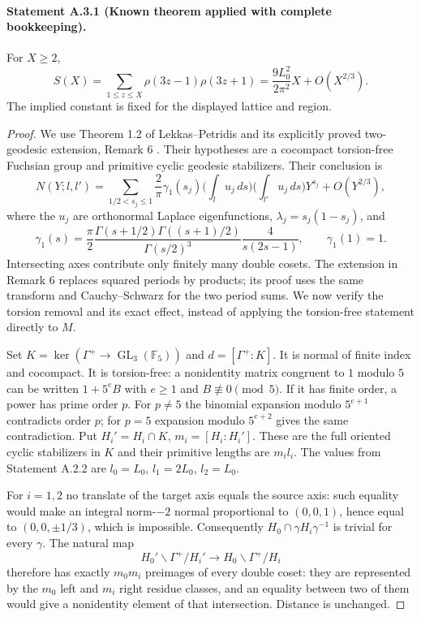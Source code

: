 \paragraph{Statement A.3.1 (Known theorem applied with complete bookkeeping).}
For $X\geq2$,
\begin{equation}\label{A:unrestricted-asymptotic}
 S(X)=\sum_{1\leq z\leq X}\rho(3z-1)\rho(3z+1)
 =\frac{9L_0^2}{2\pi^2}X+O(X^{2/3}).
\end{equation}
The implied constant is fixed for the displayed lattice and region.
\begin{proof}
We use Theorem 1.2 of Lekkas--Petridis and its explicitly proved
two-geodesic extension, Remark 6 \cite{LekkasPetridis2026}.
Their hypotheses are a cocompact torsion-free Fuchsian group and
primitive cyclic geodesic stabilizers. Their conclusion is
\[
 N(Y;l,l')=\sum_{1/2<s_j\leq1}\frac2\pi\gamma_1(s_j)
  \Big(\int_lu_j\,ds\Big)\Big(\int_{l'}u_j\,ds\Big)Y^{s_j}
  +O(Y^{2/3}),
\]
where the $u_j$ are orthonormal Laplace eigenfunctions,
$\lambda_j=s_j(1-s_j)$, and
\[
 \gamma_1(s)=\frac\pi2
 \frac{\Gamma(s+1/2)\Gamma((s+1)/2)}{\Gamma(s/2)^3}
 \frac4{s(2s-1)},\qquad \gamma_1(1)=1.
\]
Intersecting axes contribute only finitely many double cosets.
The extension in Remark 6 replaces squared periods by products;
its proof uses the same transform and Cauchy--Schwarz for the two
period sums. We now verify the torsion removal and its exact effect,
instead of applying the torsion-free statement directly to $M$.

Set $K=\ker(\Gamma^+\to\operatorname{GL}_3(\mathbb F_5))$ and
$d=[\Gamma^+:K]$. It is normal of finite index and cocompact.
It is torsion-free: a nonidentity matrix congruent to $1$ modulo $5$
can be written $1+5^eB$ with $e\geq1$ and $B\not\equiv0\pmod5$.
If it has finite order, a power has prime order $p$. For $p\ne5$
the binomial expansion modulo $5^{e+1}$ contradicts order $p$;
for $p=5$ expansion modulo $5^{e+2}$ gives the same contradiction.
Put $H_i'=H_i\cap K$, $m_i=[H_i:H_i']$. These are the full
oriented cyclic stabilizers in $K$ and their primitive lengths are
$m_i l_i$. The values from Statement A.2.2 are
$l_0=L_0$, $l_1=2L_0$, $l_2=L_0$.

For $i=1,2$ no translate of the target axis equals the source axis:
such equality would make an integral norm-$-2$ normal proportional
to $(0,0,1)$, hence equal to $(0,0,\pm1/3)$, which is impossible.
Consequently $H_0\cap\gamma H_i\gamma^{-1}$ is trivial for every
$\gamma$. The natural map
\[
 H_0'\backslash\Gamma^+/H_i'\longrightarrow
 H_0\backslash\Gamma^+/H_i
\]
therefore has exactly $m_0m_i$ preimages of every double coset:
they are represented by the $m_0$ left and $m_i$ right residue
classes, and an equality between two of them would give a
nonidentity element of that intersection. Distance is unchanged.


\end{proof}
